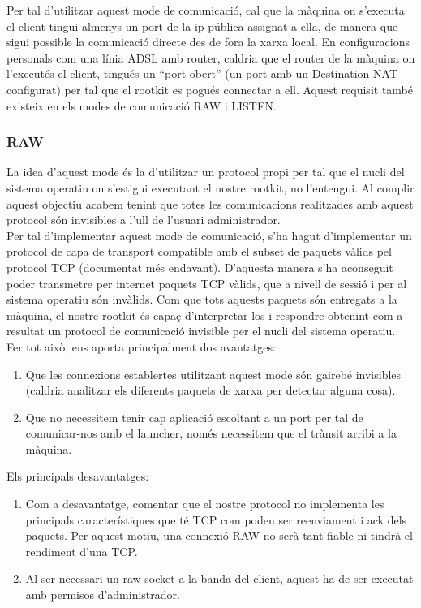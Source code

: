 Per tal d'utilitzar aquest mode de comunicació, cal que la màquina on s'executa el client tingui almenys
un port de la ip pública assignat a ella, de manera que sigui possible la comunicació directe des de fora
la xarxa local. En configuracions personals com una línia ADSL amb router, caldria que el router de la màquina
on l'executés el client, tingués un ``port obert'' (un port amb un Destination NAT configurat) per tal que el rootkit es pogués 
connectar a ell. Aquest requisit també existeix en els modes de comunicació RAW i LISTEN. \\

\subsubsection{RAW}

La idea d'aquest mode és la d'utilitzar un protocol propi per tal que el nucli del sistema operatiu on
s'estigui executant el nostre rootkit, no l'entengui. Al complir aquest objectiu acabem tenint que totes les
comunicacions realitzades amb aquest protocol són invisibles a l'ull de l'usuari administrador. \\

Per tal d'implementar aquest mode de comunicació, s'ha hagut d'implementar un protocol de capa de transport 
compatible amb el subset de paquets vàlids pel protocol TCP (documentat més endavant). D'aquesta manera s'ha 
aconseguit poder transmetre per internet paquets TCP vàlids, que a nivell de sessió i per al sistema operatiu són invàlids. 
Com que tots aquests paquets són entregats a la màquina, el nostre rootkit és capaç d'interpretar-los i 
respondre obtenint com a resultat un protocol de comunicació invisible per el nucli del sistema operatiu. \\

Fer tot això, ens aporta principalment dos avantatges: \\

\begin{enumerate}
    \item Que les connexions establertes utilitzant aquest mode són gairebé invisibles (caldria analitzar els
        diferents paquets de xarxa per detectar alguna cosa).
    \item Que no necessitem tenir cap aplicació escoltant a un port per tal de comunicar-nos amb el launcher, només
        necessitem que el trànsit arribi a la màquina.
\end{enumerate}

Els principals desavantatges: \\
\begin{enumerate}
    \item Com a desavantatge, comentar que el nostre protocol no implementa les principals característiques que té TCP
        com poden ser reenviament i ack dels paquets. Per aquest motiu, una connexió RAW no serà tant
        fiable ni tindrà el rendiment d'una TCP. \\
    \item Al ser necessari un raw socket a la banda del client, aquest ha de ser executat amb permisos d'administrador.
\end{enumerate}

